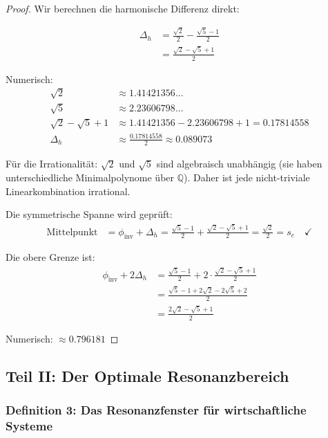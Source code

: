 \documentclass[a4paper,12pt,twoside]{report}
\theoremstyle{definition}
\begin{document}
\begin{proof}

Wir berechnen die harmonische Differenz direkt:

\begin{align}
\Delta_h &= \frac{\sqrt{2}}{2} - \frac{\sqrt{5}-1}{2} \\
&= \frac{\sqrt{2} - \sqrt{5} + 1}{2}
\end{align}

Numerisch:
\begin{align}
\sqrt{2} &\approx 1.41421356... \\
\sqrt{5} &\approx 2.23606798... \\
\sqrt{2} - \sqrt{5} + 1 &\approx 1.41421356 - 2.23606798 + 1 = 0.17814558 \\
\Delta_h &\approx \frac{0.17814558}{2} \approx 0.089073
\end{align}

Für die Irrationalität: $\sqrt{2}$ und $\sqrt{5}$ sind algebraisch unabhängig (sie haben unterschiedliche Minimalpolynome über $\mathbb{Q}$). Daher ist jede nicht-triviale Linearkombination irrational.

Die symmetrische Spanne wird geprüft:
\begin{align}
\text{Mittelpunkt} &= \phi_{\text{inv}} + \Delta_h = \frac{\sqrt{5}-1}{2} + \frac{\sqrt{2}-\sqrt{5}+1}{2} = \frac{\sqrt{2}}{2} = s_c \quad \checkmark
\end{align}

Die obere Grenze ist:
\begin{align}
\phi_{\text{inv}} + 2\Delta_h &= \frac{\sqrt{5}-1}{2} + 2 \cdot \frac{\sqrt{2}-\sqrt{5}+1}{2} \\
&= \frac{\sqrt{5}-1 + 2\sqrt{2} - 2\sqrt{5} + 2}{2} \\
&= \frac{2\sqrt{2} - \sqrt{5} + 1}{2}
\end{align}

Numerisch: $\approx 0.796181$

\end{proof}

\subsection{Teil II: Der Optimale Resonanzbereich}

\subsubsection{Definition 3: Das Resonanzfenster für wirtschaftliche Systeme}
\end{document}

